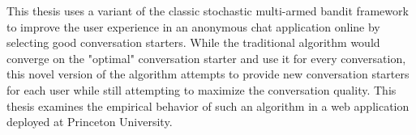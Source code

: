 This thesis uses a variant of the classic stochastic multi-armed bandit framework to improve the user experience in an anonymous chat application online by selecting good conversation starters. While the traditional algorithm would converge on the "optimal" conversation starter and use it for every conversation, this novel version of the algorithm attempts to provide new conversation starters for each user while still attempting to maximize the conversation quality. This thesis examines the empirical behavior of such an algorithm in a web application deployed at Princeton University.
